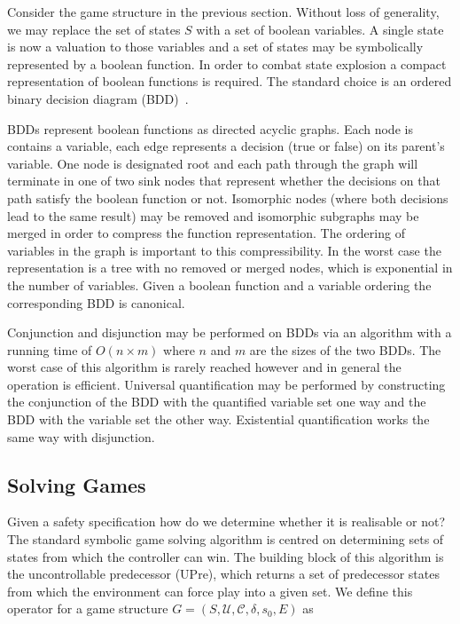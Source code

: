 Consider the game structure in the previous section. Without loss of generality, we may replace the set of states $S$ with a set of boolean variables. A single state is now a valuation to those variables and a set of states may be symbolically represented by a boolean function. In order to combat state explosion a compact representation of boolean functions is required. The standard choice is an ordered binary decision diagram (BDD)~\cite{Bryant86}.

BDDs represent boolean functions as directed acyclic graphs. Each node is contains a variable, each edge represents a decision (true or false) on its parent's variable. One node is designated root and each path through the graph will terminate in one of two sink nodes that represent whether the decisions on that path satisfy the boolean function or not. Isomorphic nodes (where both decisions lead to the same result) may be removed and isomorphic subgraphs may be merged in order to compress the function representation. The ordering of variables in the graph is important to this compressibility. In the worst case the representation is a tree with no removed or merged nodes, which is exponential in the number of variables. Given a boolean function and a variable ordering the corresponding BDD is canonical.

Conjunction and disjunction may be performed on BDDs via an algorithm with a running time of $O(n \times m)$ where $n$ and $m$ are the sizes of the two BDDs. The worst case of this algorithm is rarely reached however and in general the operation is efficient. Universal quantification may be performed by constructing the conjunction of the BDD with the quantified variable set one way and the BDD with the variable set the other way. Existential quantification works the same way with disjunction.

\subsection{Solving Games}

Given a safety specification how do we determine whether it is realisable or not? The standard symbolic game solving algorithm is centred on determining sets of states from which the controller can win. The building block of this algorithm is the uncontrollable predecessor (UPre), which returns a set of predecessor states from which the environment can force play into a given set. We define this operator for a game structure $G = (S, \mathcal{U}, \mathcal{C}, \delta, s_0, E)$ as 

